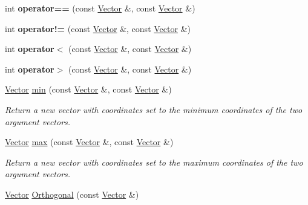 \begin{DoxyCompactItemize}
\item 
\hypertarget{class_vector_aca63309fd635cd4fa72e5335b76e1c21}{
int {\bfseries operator==} (const \hyperlink{class_vector}{\-Vector} \&, const \hyperlink{class_vector}{\-Vector} \&)}
\label{class_vector_aca63309fd635cd4fa72e5335b76e1c21}

\item 
\hypertarget{class_vector_ade583d2f018e2ff120d78c0e0998a422}{
int {\bfseries operator!=} (const \hyperlink{class_vector}{\-Vector} \&, const \hyperlink{class_vector}{\-Vector} \&)}
\label{class_vector_ade583d2f018e2ff120d78c0e0998a422}

\item 
\hypertarget{class_vector_ac6abefa6e71400fc5de5ca68b5ca7651}{
int {\bfseries operator$<$} (const \hyperlink{class_vector}{\-Vector} \&, const \hyperlink{class_vector}{\-Vector} \&)}
\label{class_vector_ac6abefa6e71400fc5de5ca68b5ca7651}

\item 
\hypertarget{class_vector_ac4e29ac8916987f0d304c44c6a98afed}{
int {\bfseries operator$>$} (const \hyperlink{class_vector}{\-Vector} \&, const \hyperlink{class_vector}{\-Vector} \&)}
\label{class_vector_ac4e29ac8916987f0d304c44c6a98afed}

\item 
\hypertarget{class_vector_a42522fc19a307d9ceca3ec122e81fea7}{
\hyperlink{class_vector}{\-Vector} \hyperlink{class_vector_a42522fc19a307d9ceca3ec122e81fea7}{min} (const \hyperlink{class_vector}{\-Vector} \&, const \hyperlink{class_vector}{\-Vector} \&)}
\label{class_vector_a42522fc19a307d9ceca3ec122e81fea7}

\begin{DoxyCompactList}\small\item\em \-Return a new vector with coordinates set to the minimum coordinates of the two argument vectors. \end{DoxyCompactList}\item 
\hypertarget{class_vector_ac7fa5b7201c15daca80958d11a93c79a}{
\hyperlink{class_vector}{\-Vector} \hyperlink{class_vector_ac7fa5b7201c15daca80958d11a93c79a}{max} (const \hyperlink{class_vector}{\-Vector} \&, const \hyperlink{class_vector}{\-Vector} \&)}
\label{class_vector_ac7fa5b7201c15daca80958d11a93c79a}

\begin{DoxyCompactList}\small\item\em \-Return a new vector with coordinates set to the maximum coordinates of the two argument vectors. \end{DoxyCompactList}\item 
\hypertarget{class_vector_ac32c66eb175b3fc3a00aa2b972af9a72}{
\hyperlink{class_vector}{\-Vector} \hyperlink{class_vector_ac32c66eb175b3fc3a00aa2b972af9a72}{\-Orthogonal} (const \hyperlink{class_vector}{\-Vector} \&)}
\label{class_vector_ac32c66eb175b3fc3a00aa2b972af9a72}


\end{DoxyCompactItemize}
